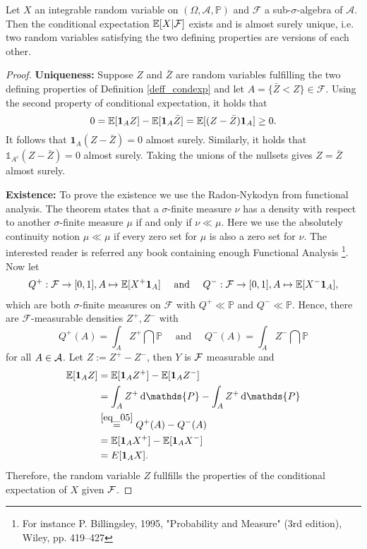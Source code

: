 \begin{lsatzwichtig}
\begin{theorem}\label{existenceCE}
	Let $X$ an integrable random variable on $(\Omega, \mathcal A, \mathbb P)$ and $\mathcal F$ a sub-$\sigma$-algebra of $\mathcal A$. Then the conditional expectation $\mathbb{E}[X|\mathcal F]$ exists and is almost surely unique, i.e. two random variables satisfying the two defining properties are versions of each other.
\end{theorem}
\end{lsatzwichtig}
\begin{proof}[Proof]
	\textbf{Uniqueness:} Suppose $Z$ and $\bar Z$ are random variables fulfilling the two defining properties of Definition \ref{deff_condexp} and let $A=\{\bar Z<Z\}\in\mathcal{F}.$ Using the second property of conditional expectation, it holds that 
	$$0=\mathbb{E}[\mathbf{1}_AZ]-\mathbb{E}[\mathbf{1}_A\bar{Z}]=\mathbb{E}[(Z-\bar{Z})\mathbf{1}_A]\ge0.$$ It follows that $\mathbf{1}_A(Z-\bar{Z})=0$ almost surely. Similarly, it holds that $\mathds{1}_{A^c}(Z-\bar{Z})=0$ almost surely. Taking the unions of the nullsets gives $Z=\bar Z$ almost surely.\smallskip
	
	\textbf{Existence:} To prove the existence we use the Radon-Nykodyn from functional analysis. The theorem states that a $\sigma$-finite measure $\nu$ has a density with respect to another $\sigma$-finite measure $\mu$ if and only if $\nu\ll \mu$. Here we use the absolutely continuity notion $\mu\ll \mu$ if every zero set for $\mu$ is also a zero set for $\nu$. The interested reader is referred any book containing enough Functional Analysis \footnote{For instance P. Billingsley, 1995, "{}Probability and Measure"{} (3rd edition), Wiley, pp. 419–427}. Now let 
	\begin{align}\label{eq_05}
		Q^+:\mathcal{F}\to[0,1],A\mapsto\mathbb{E}[X^+\mathbf{1}_A]\quad\text{ and }\quad Q^-:\mathcal{F}\to[0,1],A\mapsto\mathbb{E}[X^-\mathbf{1}_A],
	\end{align}
	which are both $\sigma$-finite measures on $\mathcal F$ with $Q^+\ll \mathbb P$ and $Q^-\ll \mathbb P$. Hence, there are $\mathcal{F}$-measurable densities $Z^+,Z^-$ with $$Q^+(A)=\int_A Z^+\dint\mathds{P}\quad \text{ and }\quad Q^-(A)=\int_A Z^-\dint\mathds{P}$$ for all $A\in\mathcal{A}$. Let $Z:=Z^+-Z^-$, then $Y$ is $\mathcal{F}$ measurable and 
	\begin{align*}
		\E[\mathbf{1}_AZ]&=\E[\mathbf{1}_AZ^+]-\E[\mathbf{1}_AZ^-]\\
		&=\int_AZ^+\dint\mathds{P}-\int_AZ^+\dint\mathds{P}\\
		&\overset{\eqref{eq_05}}=Q^+(A)-Q^-(A)\\
		&=\E[\mathbf{1}_AX^+]-\E[\mathbf{1}_AX^-]\\
		&=E[\mathbf{1}_AX].
	\end{align*}
	Therefore, the random variable $Z$ fullfills the properties of the conditional expectation of $X$ given $\mathcal{F}$.
\end{proof}
	\marginpar{\textcolor{red}{Lecture 2}}


